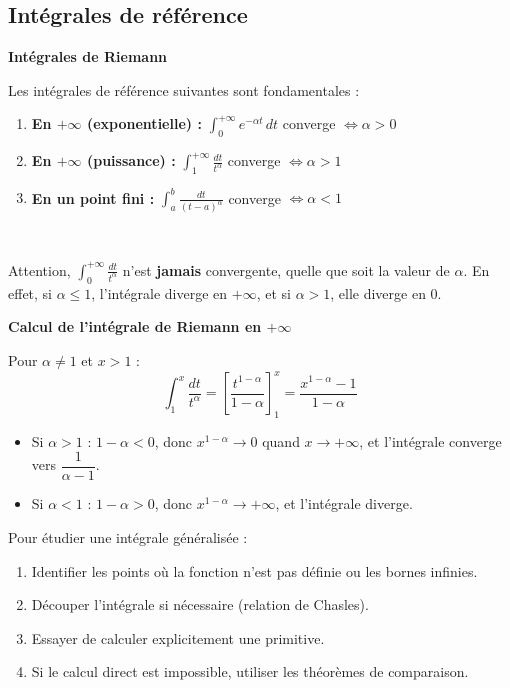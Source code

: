 \documentclass[../PolyS4.tex]{subfiles}
\begin{document}
\subsection{Intégrales de référence}

\begin{Thm}
\textbf{Intégrales de Riemann}

Les intégrales de référence suivantes sont fondamentales :

\begin{enumerate}
\item \textbf{En $+\infty$ (exponentielle) :} $\displaystyle\int_{0}^{+\infty} e^{-\alpha t} \, dt$ converge $\Leftrightarrow \alpha > 0$

\item \textbf{En $+\infty$ (puissance) :} $\displaystyle\int_{1}^{+\infty} \frac{dt}{t^{\alpha}}$ converge $\Leftrightarrow \alpha > 1$

\item \textbf{En un point fini :} $\displaystyle\int_{a}^{b} \frac{dt}{(t-a)^{\alpha}}$ converge $\Leftrightarrow \alpha < 1$
\end{enumerate}
\end{Thm}

\begin{Rmq}$\,$

Attention, $\displaystyle\int_{0}^{+\infty} \frac{dt}{t^{\alpha}}$ n'est \textbf{jamais} convergente, quelle que soit la valeur de $\alpha$. En effet, si $\alpha \leq 1$, l'intégrale diverge en $+\infty$, et si $\alpha > 1$, elle diverge en $0$.
\end{Rmq}

\begin{Ex}
\textbf{Calcul de l'intégrale de Riemann en $+\infty$}

Pour $\alpha \neq 1$ et $x > 1$ :
$$\int_{1}^{x} \frac{dt}{t^{\alpha}} = \left[\frac{t^{1-\alpha}}{1-\alpha}\right]_{1}^{x} = \frac{x^{1-\alpha} - 1}{1-\alpha}$$

\begin{itemize}
\item Si $\alpha > 1$ : $1-\alpha < 0$, donc $x^{1-\alpha} \to 0$ quand $x \to +\infty$, et l'intégrale converge vers $\dfrac{1}{\alpha - 1}$.
\item Si $\alpha < 1$ : $1-\alpha > 0$, donc $x^{1-\alpha} \to +\infty$, et l'intégrale diverge.
\end{itemize}
\end{Ex}

\begin{Meth}
Pour étudier une intégrale généralisée :
\begin{enumerate}
\item Identifier les points où la fonction n'est pas définie ou les bornes infinies.
\item Découper l'intégrale si nécessaire (relation de Chasles).
\item Essayer de calculer explicitement une primitive.
\item Si le calcul direct est impossible, utiliser les théorèmes de comparaison.
\end{enumerate}
\end{Meth}
\end{document}
